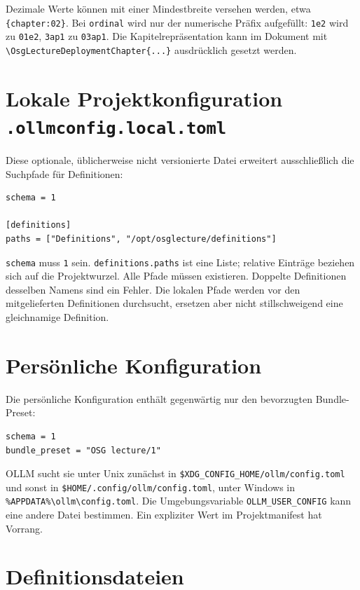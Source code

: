 \documentclass[
load-preamble+
]{osgdoc}
\begin{document}
Dezimale Werte können mit einer Mindestbreite versehen werden, etwa
\texttt{\{chapter:02\}}. Bei \texttt{ordinal} wird nur der numerische Präfix
aufgefüllt: \texttt{1e2} wird zu \texttt{01e2}, \texttt{3ap1} zu
\texttt{03ap1}. Die Kapitelrepräsentation kann im Dokument mit
\verb|\OsgLectureDeploymentChapter{...}| ausdrücklich gesetzt werden.

\section{Lokale Projektkonfiguration \texttt{.ollmconfig.local.toml}}

Diese optionale, üblicherweise nicht versionierte Datei erweitert ausschließlich
die Suchpfade für Definitionen:

\begin{verbatim}
schema = 1

[definitions]
paths = ["Definitions", "/opt/osglecture/definitions"]
\end{verbatim}

\verb|schema| muss \texttt{1} sein. \verb|definitions.paths| ist eine Liste;
relative Einträge beziehen sich auf die Projektwurzel. Alle Pfade müssen
existieren. Doppelte Definitionen desselben Namens sind ein Fehler. Die lokalen
Pfade werden vor den mitgelieferten Definitionen durchsucht, ersetzen aber
nicht stillschweigend eine gleichnamige Definition.

\section{Persönliche Konfiguration}

Die persönliche Konfiguration enthält gegenwärtig nur den bevorzugten
Bundle-Preset:

\begin{verbatim}
schema = 1
bundle_preset = "OSG lecture/1"
\end{verbatim}

OLLM sucht sie unter Unix zunächst in \verb|$XDG_CONFIG_HOME/ollm/config.toml|
und sonst in \verb|$HOME/.config/ollm/config.toml|, unter Windows in
\verb|%APPDATA%\ollm\config.toml|. Die Umgebungsvariable
\verb|OLLM_USER_CONFIG| kann eine andere Datei bestimmen. Ein expliziter Wert
im Projektmanifest hat Vorrang.

\section{Definitionsdateien}
\end{document}
